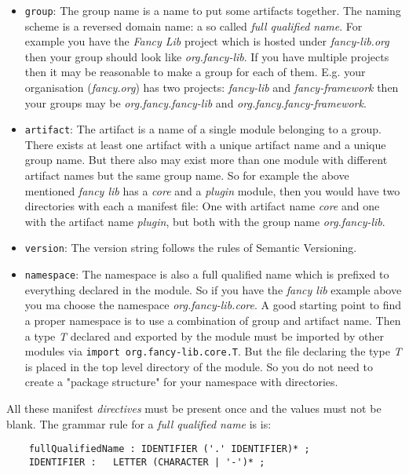 \documentclass[a4paper,12pt]{report}
\begin{document}
\begin{itemize}
    \item \verb|group|: The group name is a name to put some artifacts together. The naming scheme is a reversed domain name: a so called \textit{full qualified name}. For example you have the \textit{Fancy Lib} project which is hosted under \textit{fancy-lib.org} then your group should look like \textit{org.fancy-lib}. If you have multiple projects then it may be reasonable to make a group for each of them. E.g. your organisation (\textit{fancy.org}) has two projects: \textit{fancy-lib} and \textit{fancy-framework} then your groups may be \textit{org.fancy.fancy-lib} and \textit{org.fancy.fancy-framework}.
    \item \verb|artifact|: The artifact is a name of a single module belonging to a group. There exists at least one artifact with a unique artifact name and a unique group name. But there also may exist more than one module with different artifact names but the same group name. So for example the above mentioned \textit{fancy lib} has a \textit{core} and a \textit{plugin} module, then you would have two directories with each a manifest file: One with artifact name \textit{core} and one with the artifact name \textit{plugin}, but both with the group name \textit{org.fancy-lib}.
    \item \verb|version|: The version string follows the rules of Semantic Versioning\cite{semver}.
    \item \verb|namespace|: The namespace is also a full qualified name which is prefixed to everything declared in the module. So if you have the \textit{fancy lib} example above you ma choose the namespace \textit{org.fancy-lib.core}. A good starting point to find a proper namespace is to use a combination of group and artifact name. Then a type \textit{T} declared and exported by the module must be imported by other modules via \verb|import org.fancy-lib.core.T|. But the file declaring the type \textit{T} is placed in the top level directory of the module. So you do not need to create a "package structure" for your namespace with directories. 
\end{itemize}

All these manifest \textit{directives} must be present once and the values must not be blank. The grammar rule for a \textit{full qualified name} is is: 

\begin{verbatim}
    fullQualifiedName : IDENTIFIER ('.' IDENTIFIER)* ;    
    IDENTIFIER :   LETTER (CHARACTER | '-')* ;
\end{verbatim}
\end{document}
